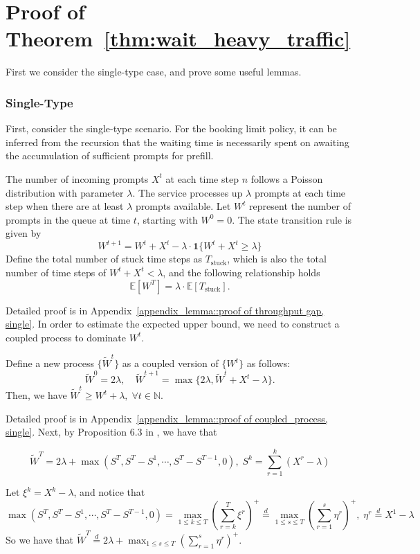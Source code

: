 \section{Proof of Theorem~\ref{thm:wait_heavy_traffic}}\label{appexidx::proof of wait_heavy_traffic}
First we consider the single-type case, and prove some useful lemmas.
\subsubsection{Single-Type}

First, consider the single-type scenario. For the booking limit policy, it can be inferred from the recursion that the waiting time is necessarily spent on awaiting the accumulation of sufficient prompts for prefill.
\begin{lemma}\label{lemma::throughput gap, single}
The number of incoming prompts $X^t$ at each time step $n$ follows a Poisson distribution with parameter $\lambda$. The service processes up $\lambda$ prompts at each time step when there are at least $\lambda$ prompts available. Let $W^t$ represent the number of prompts in the queue at time $t$, starting with $W^0=0$. The state transition rule is given by
$$W^{t+1}=W^t+X^t-\lambda\cdot \mathbf{1}\{W^t+X^t\geq \lambda\}$$
Define the total number of stuck time steps as $T_{\text{stuck}}$, which is also the total number of time steps of $W^t+X^t<\lambda$, and the following relationship holds
$$\mathbb{E}[W^T]= \lambda\cdot\mathbb{E}[T_{\text{stuck}}].$$
\end{lemma}
Detailed proof is in Appendix~\ref{appendix_lemma::proof of throughput gap, single}. In order to estimate the expected upper bound, we need to construct a coupled process to dominate $W^t$.

\begin{lemma}\label{lem:coupled_process, single}
Define a new process $\{\tilde{W}^t\}$ as a coupled version of $\{W^t\}$ as follows:
$$
\tilde{W}^0 = 2\lambda, \quad \tilde{W}^{t+1} = \max\{ 2\lambda, \tilde{W}^t + X^t - \lambda \}.
$$
Then, we have $\tilde{W}^t \geq W^t + \lambda, \;\forall t\in \mathbb{N}$.
\end{lemma}
Detailed proof is in Appendix~\ref{appendix_lemma::proof of coupled_process, single}. Next, by Proposition 6.3 in \cite{asmussen2003applied}, we have that 
\begin{lemma}
    $$\tilde{W}^T=2\lambda+\max(S^T, S^T-S^1,\cdots,S^T-S^{T-1},0),\; S^k=\sum_{r=1}^k (X^r-\lambda) $$
\end{lemma}
Let $\xi^k = X^k-\lambda$, and notice that 
$$\max(S^T, S^T-S^1,\cdots,S^T-S^{T-1},0)=\max_{1\leq k\leq T}(\sum_{r=k}^{T}\xi^r)^+\overset{d}{=}\max_{1\leq s\leq T}(\sum_{r=1}^{s}\eta^r)^+, \; \eta^r\overset{d}{=}X^1-\lambda$$
So we have that $\tilde{W}^T \overset{d}{=}2\lambda+\max_{1\leq s\leq T}(\sum_{r=1}^{s}\eta^r)^+ $. 

